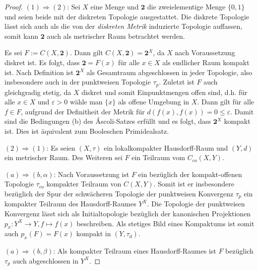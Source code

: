 \begin{proof}
  $(1) \Rightarrow (2)$: Sei $X$ eine Menge und $\mathbf{2}$ die zweielementige Menge $\{0,1\}$ und seien beide mit der diskreten Topologie ausgestattet. 
  Die diskrete Topologie lässt sich auch als die von der \textit{diskreten Metrik} induzierte Topologie auffassen, somit kann $\mathbf{2}$ auch als metrischer Raum betrachtet werden. 

  Es sei $F := C(X, \mathbf{2})$.
  Dann gilt $C(X, \mathbf{2}) = \mathbf{2}^X$, da $X$ nach Voraussetzung diskret ist.
  Es folgt, dass $\mathbf{2} = F(x)$ für alle $x \in X$ als endlicher Raum kompakt ist.
  Nach Definition ist $\mathbf{2}^X$ als Gesamtraum abgeschlossen in jeder Topologie, also insbesondere auch in der punktweisen Topologie $\tau_p$.
  Zuletzt ist $F$ auch gleichgradig stetig, da $X$ diskret und somit Einpunktmengen offen sind, d.h. für alle $x \in X$ und $\varepsilon > 0$ wähle man $\{x\}$ als offene Umgebung in $X$. Dann gilt für alle $f \in F$, aufgrund der Definitheit der Metrik für  $d(f(x),f(x)) = 0 \leq \varepsilon$.
  Damit sind die Bedingungen (b) des Áscoli-Satzes erfüllt und es folgt, dass $\mathbf{2}^X$ kompakt ist. Dies ist äquivalent zum Booleschen Primidealsatz.

  $(2) \Rightarrow (1)$: Es seien $(X,\tau)$ ein lokalkompakter Hausdorff-Raum und $(Y,d)$ ein metrischer Raum.
  Des Weiteren sei $F$ ein Teilraum vom $C_{co}(X,Y)$.

  $(a) \Rightarrow (b, \alpha)$: 
  Nach Voraussetzung ist $F$ ein bezüglich der kompakt-offenen Topologie $\tau_{co}$ kompakter Teilraum von $C(X,Y)$.
  Somit ist er insbesondere bezüglich der Spur der schwächeren Topologie der punktweisen Konvergenz $\tau_p$ ein kompakter Teilraum des Hausdorff-Raumes $Y^X$.
  Die Topologie der punktweisen Konvergenz lässt sich als Initialtopologie bezüglich der kanonischen Projektionen $p_x : Y^X \to Y, f \mapsto f(x)$ beschreiben.
  Als stetiges Bild eines Kompaktums ist somit auch $p_x(F) = F(x)$ kompakt in $(Y,\tau_d)$.

  $(a) \Rightarrow (b, \beta)$:  
  Als kompakter Teilraum eines Hausdorff-Raumes ist $F$ bezüglich $\tau_p$ auch abgeschlossen in $Y^X$.


\end{proof}

